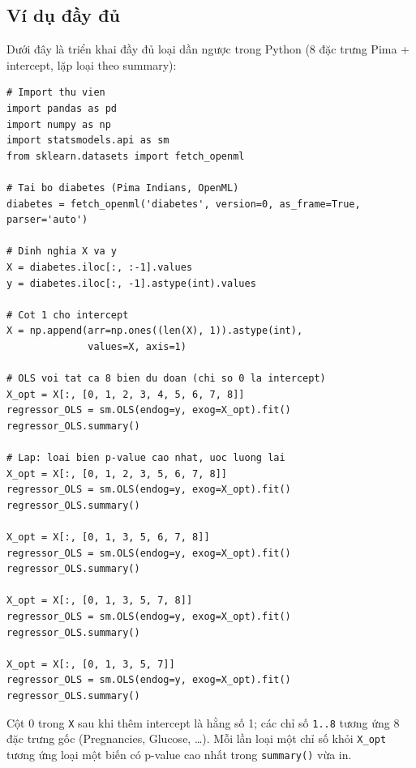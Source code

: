 \subsection{Ví dụ đầy đủ}

\begin{dongco}[title={Triển khai hoàn chỉnh}]
Dưới đây là triển khai đầy đủ loại dần ngược trong Python (8 đặc trưng Pima + intercept, lặp loại theo summary):
\end{dongco}

\begin{vidu}[title={Mã Python đầy đủ}]
\begin{lstlisting}
# Import thu vien
import pandas as pd
import numpy as np
import statsmodels.api as sm
from sklearn.datasets import fetch_openml

# Tai bo diabetes (Pima Indians, OpenML)
diabetes = fetch_openml('diabetes', version=0, as_frame=True, parser='auto')

# Dinh nghia X va y
X = diabetes.iloc[:, :-1].values
y = diabetes.iloc[:, -1].astype(int).values

# Cot 1 cho intercept
X = np.append(arr=np.ones((len(X), 1)).astype(int),
              values=X, axis=1)

# OLS voi tat ca 8 bien du doan (chi so 0 la intercept)
X_opt = X[:, [0, 1, 2, 3, 4, 5, 6, 7, 8]]
regressor_OLS = sm.OLS(endog=y, exog=X_opt).fit()
regressor_OLS.summary()

# Lap: loai bien p-value cao nhat, uoc luong lai
X_opt = X[:, [0, 1, 2, 3, 5, 6, 7, 8]]
regressor_OLS = sm.OLS(endog=y, exog=X_opt).fit()
regressor_OLS.summary()

X_opt = X[:, [0, 1, 3, 5, 6, 7, 8]]
regressor_OLS = sm.OLS(endog=y, exog=X_opt).fit()
regressor_OLS.summary()

X_opt = X[:, [0, 1, 3, 5, 7, 8]]
regressor_OLS = sm.OLS(endog=y, exog=X_opt).fit()
regressor_OLS.summary()

X_opt = X[:, [0, 1, 3, 5, 7]]
regressor_OLS = sm.OLS(endog=y, exog=X_opt).fit()
regressor_OLS.summary()
\end{lstlisting}
\end{vidu}

\begin{luuy}[title={Chi số cột trong X\_opt}]
Cột 0 trong \texttt{X} sau khi thêm intercept là hằng số 1; các chỉ số \texttt{1..8} tương ứng 8 đặc trưng gốc (Pregnancies, Glucose, \ldots). Mỗi lần loại một chỉ số khỏi \texttt{X\_opt} tương ứng loại một biến có p-value cao nhất trong \texttt{summary()} vừa in.
\end{luuy}

